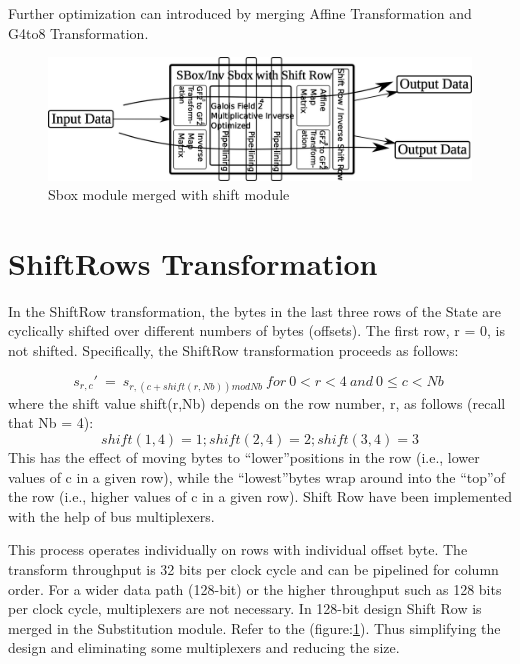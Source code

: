\documentclass[10pt, conference, compsocconf]{IEEEtran}
\begin{document}
Further optimization can introduced by merging Affine Transformation and G4to8 Transformation.


\begin{figure}
\centering
\includegraphics[width=0.50 \textwidth]{sbox.png}
\caption{Sbox module merged with shift module}
\label{Sbox}
\end{figure}

\section{ShiftRows Transformation}
\label{sec:shift}

In the ShiftRow transformation, the bytes in the last three rows of the State are cyclically shifted over different numbers of bytes (offsets). The first row, r = 0, is not shifted. Specifically, the ShiftRow transformation proceeds as follows:

\begin{equation}
s_{r,c}'~ = ~s_{r,(c+shift(r,Nb))mod Nb}  ~ for ~0<r<4~ and ~0\leq c <Nb~
\label{eq:sub3}
\end{equation}
where the shift value shift(r,Nb) depends on the row number, r, as follows (recall that Nb = 4): 
\begin{equation}
shift (1,4) = 1 ; shift (2,4) = 2 ; shift (3,4) = 3 
\label{eq:sub4}
\end{equation}
This has the effect of moving bytes to \textquotedblleft lower\textquotedblright  positions in the row (i.e., lower values of c in a given row), while the \textquotedblleft lowest\textquotedblright  bytes wrap around into the \textquotedblleft top\textquotedblright  of the row (i.e., higher values of c in a given row). 
Shift Row have been implemented with the help of bus multiplexers.

This process operates individually on rows with individual offset byte.  The transform throughput is 32 bits per clock cycle and can be pipelined for column order. For a wider data path (128-bit) or the higher throughput such as 128 bits per clock cycle, multiplexers are not necessary. In 128-bit design Shift Row is merged in the Substitution module. Refer to the (figure:\ref{Sbox}). Thus simplifying the design and eliminating some multiplexers and reducing the size.
\end{document}
